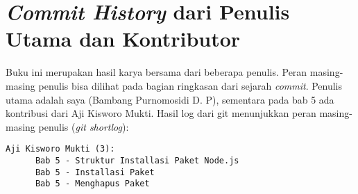 \chapter{\textit{Commit History} dari Penulis Utama dan Kontributor}

Buku ini merupakan hasil karya bersama dari beberapa penulis. Peran masing-masing penulis bisa dilihat pada bagian ringkasan dari sejarah \textit{commit}. Penulis utama adalah saya (Bambang Purnomosidi D. P), sementara pada bab 5 ada kontribusi dari Aji Kisworo Mukti. Hasil log dari git menunjukkan peran masing-masing penulis (\textit{git shortlog}):

\begin{lstlisting}
Aji Kisworo Mukti (3):
      Bab 5 - Struktur Installasi Paket Node.js
      Bab 5 - Installasi Paket
      Bab 5 - Menghapus Paket


\end{lstlisting}
